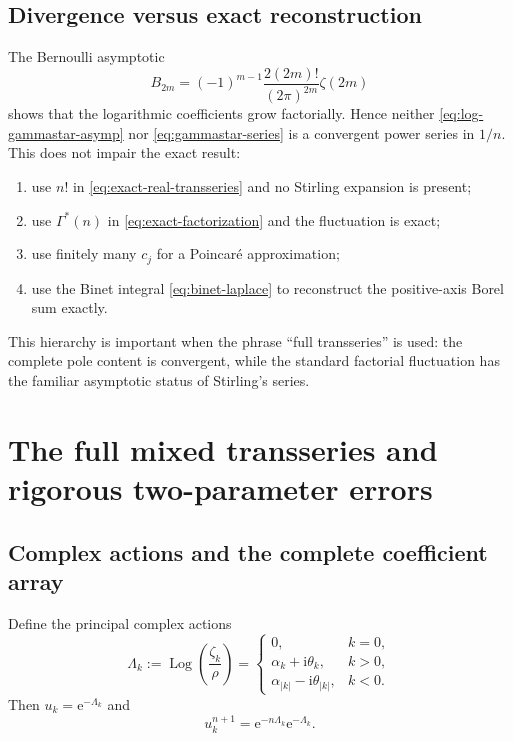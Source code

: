 \documentclass[11pt,a4paper,oneside]{article}
\theoremstyle{definition}
\theoremstyle{remark}
\newcommand{\Log}{\operatorname{Log}}
\newcommand{\e}{\mathrm{e}}
\newcommand{\ii}{\mathrm{i}}
\newcommand{\GammaStar}{\Gamma^{\!*}}
\begin{document}
\subsection{Divergence versus exact reconstruction}
The Bernoulli asymptotic
\[
 B_{2m}=(-1)^{m-1}\frac{2(2m)!}{(2\pi)^{2m}}\zeta(2m)
\]
shows that the logarithmic coefficients grow factorially.  Hence neither
\cref{eq:log-gammastar-asymp} nor \cref{eq:gammastar-series} is a convergent
power series in $1/n$.  This does not impair the exact result:
\begin{enumerate}
 \item use $n!$ in \cref{eq:exact-real-transseries} and no Stirling expansion
       is present;
 \item use $\GammaStar(n)$ in \cref{eq:exact-factorization} and the
       fluctuation is exact;
 \item use finitely many $c_j$ for a Poincar\'e approximation;
 \item use the Binet integral \cref{eq:binet-laplace} to reconstruct the
       positive-axis Borel sum exactly.
\end{enumerate}
This hierarchy is important when the phrase ``full transseries'' is used:
the complete pole content is convergent, while the standard factorial
fluctuation has the familiar asymptotic status of Stirling's series.

\section{The full mixed transseries and rigorous two-parameter errors}
\label{sec:mixed-transseries}

\subsection{Complex actions and the complete coefficient array}
Define the principal complex actions
\begin{equation}\label{eq:Lambda-def}
 \Lambda_k:=\Log\!\left(\frac{\zeta_k}{\rho}\right)
 =\begin{cases}
 0,&k=0,\\
 \alpha_k+\ii\theta_k,&k>0,\\
 \alpha_{|k|}-\ii\theta_{|k|},&k<0.
 \end{cases}
\end{equation}
Then $u_k=\e^{-\Lambda_k}$ and
\[
 u_k^{n+1}=\e^{-n\Lambda_k}\e^{-\Lambda_k}.
\]
\end{document}
